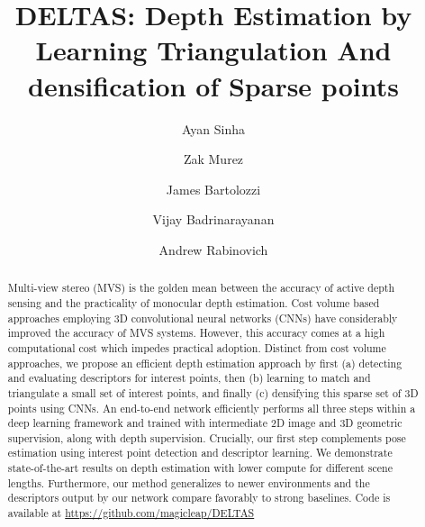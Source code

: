 \documentclass[runningheads]{llncs}
\begin{document}
\pagestyle{headings}
\mainmatter
\def\ECCVSubNumber{3649}  

\title{DELTAS: Depth Estimation by Learning Triangulation And densification of Sparse points} 



\author{Ayan Sinha \and
Zak Murez \and
James Bartolozzi \inst{*} \and Vijay Badrinarayanan  \and Andrew Rabinovich }
\maketitle

\begin{abstract}
Multi-view stereo (MVS) is the golden mean between the accuracy of active depth sensing and the practicality of monocular depth estimation. Cost volume based approaches employing 3D convolutional neural networks (CNNs) have considerably improved the accuracy of MVS systems. However, this accuracy comes at a high computational cost which impedes practical adoption. Distinct from cost volume approaches, we propose an efficient depth estimation approach by first (a) detecting and evaluating descriptors for interest points, then (b) learning to match and triangulate a small set of interest points, and finally (c) densifying this sparse set of 3D points using CNNs. An end-to-end network efficiently performs all three steps within a deep learning framework and trained with intermediate 2D image and 3D geometric supervision, along with depth supervision.  Crucially, our first step complements pose estimation using interest point detection and descriptor learning. We demonstrate state-of-the-art results on depth estimation with lower compute for different scene lengths. Furthermore, our method generalizes to newer environments and the descriptors output by our network compare favorably to strong baselines. Code is available at \url{https://github.com/magicleap/DELTAS}  



   

















\end{abstract}
\end{document}
